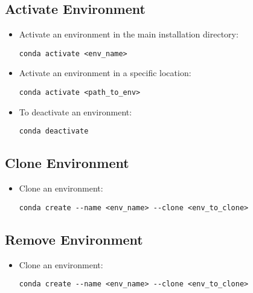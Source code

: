 
\subsection{Activate Environment}

\begin{itemize}
    \item Activate an environment in the main installation directory:
    \begin{verbatim}
conda activate <env_name>
    \end{verbatim}
    \item Activate an environment in a specific location:
    \begin{verbatim}
conda activate <path_to_env>
    \end{verbatim}
    \item To deactivate an environment:
    \begin{verbatim}
conda deactivate
    \end{verbatim}
\end{itemize}


\subsection{Clone Environment}

\begin{itemize}
    \item Clone an environment:
    \begin{verbatim}
conda create --name <env_name> --clone <env_to_clone>
    \end{verbatim}
\end{itemize}


\subsection{Remove Environment}

\begin{itemize}
    \item Clone an environment:
    \begin{verbatim}
conda create --name <env_name> --clone <env_to_clone>
    \end{verbatim}
\end{itemize}

